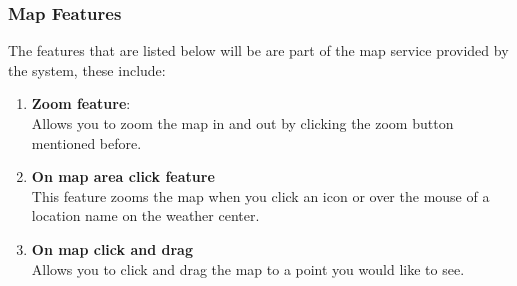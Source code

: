 \subsubsection{Map Features}
The features that are listed below will be are part of the map service provided by the system, these include:
\begin{enumerate}
\item \textbf{Zoom feature}:\\
Allows you to zoom the map in and out by clicking the zoom button mentioned before.

\item \textbf{On map area click feature}\\
This feature zooms the map when you click an icon or over the mouse of a location name on the weather center.
\item \textbf{On map click and drag}\\
Allows you to click and drag the map to a point you would like to see.
\end{enumerate}

